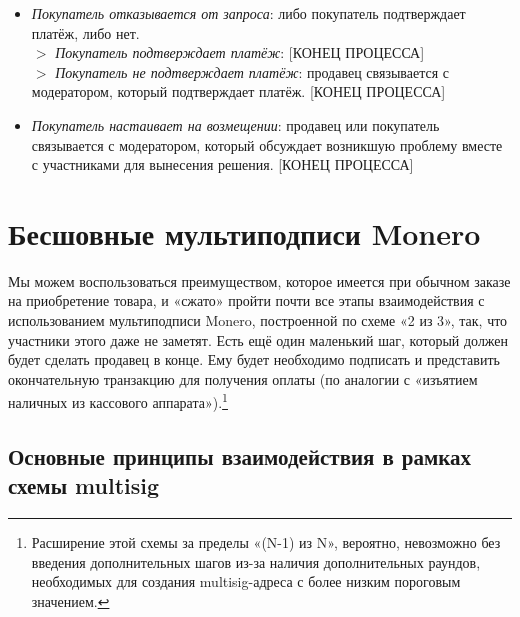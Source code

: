 \begin{enumerate}
\begin{itemize}
\begin{enumerate}
\begin{itemize}
\begin{itemize}
                    \begin{itemize}
                        \item {\em Покупатель отказывается от запроса}: либо покупатель подтверждает платёж, либо нет.\\
                        $>$ {\em Покупатель подтверждает платёж}: [КОНЕЦ ПРОЦЕССА]\\
                        $>$ {\em Покупатель не подтверждает платёж}: продавец связывается с модератором, который подтверждает платёж. [КОНЕЦ ПРОЦЕССА]
                        \item {\em Покупатель настаивает на возмещении}: продавец или покупатель связывается с модератором, который обсуждает возникшую проблему вместе с участниками для вынесения решения. [КОНЕЦ ПРОЦЕССА]
                    \end{itemize}{}
                \end{itemize}
            \end{itemize}{}
        \end{enumerate}{}
    \end{itemize}{}
\end{enumerate}{}



\section{Бесшовные мультиподписи Monero}
\label{sec:escrowed-marketplace-seamless-multisig}

Мы можем воспользоваться преимуществом, которое имеется при обычном заказе на приобре\-тение товара, и «сжато» пройти почти все этапы взаимодействия с использованием мульти\-подписи Monero, построенной по схеме «2 из 3», так, что участники этого даже не заметят. Есть ещё один маленький шаг, который должен будет сделать продавец в конце. Ему будет необходимо подписать и представить окончательную транзакцию для получения оплаты (по аналогии с «изъятием наличных из кассового аппарата»).\footnote{Расширение этой схемы за пределы «(N-1) из N», вероятно, невозможно без введения дополнительных шагов из-за наличия дополнительных раундов, необходимых для создания multisig-адреса с более низким пороговым значением.}


\subsection{Основные принципы взаимодействия в рамках схемы multisig}
\label{subsec:escrowed-marketplace-multisig-interaction-basics}

